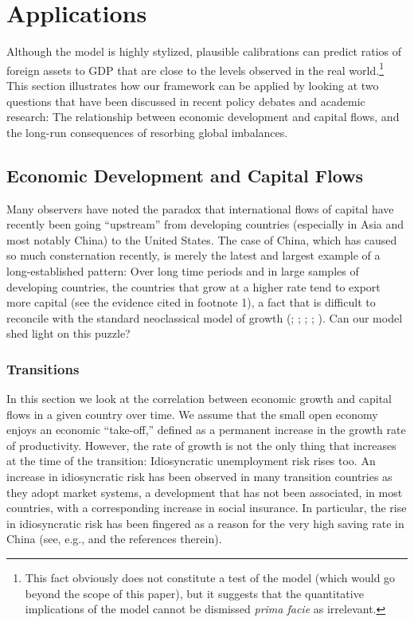 \documentclass[titlepage]{\econtex}\newcommand{\texname}{cjSOE}
\begin{document}
\medskip



\section{Applications}

Although the model is highly stylized, plausible calibrations can
predict ratios of foreign assets to GDP that are close to the levels
observed in the real world.\footnote{This fact obviously does not constitute a
test of the model (which would go beyond the scope of this paper), but
it suggests that the quantitative implications of the model cannot be
dismissed {\it prima facie} as irrelevant.} This section illustrates
how our framework can be applied by looking at two questions that have
been discussed in recent policy debates and academic research: The
relationship between economic development and capital flows, and the
long-run consequences of resorbing global imbalances.

\subsection{Economic Development and Capital Flows}

Many observers have noted the paradox that international flows of
capital have recently been going ``upstream'' from developing
countries (especially in Asia and most notably China) to the United
States. The case of China, which has caused so much consternation
recently, is merely the latest and largest example of a
long-established pattern: Over long time periods and in large samples
of developing countries, the countries that grow at a higher rate tend
to export more capital (see the evidence cited in footnote 1), a fact
that is difficult to reconcile with the standard neoclassical model of
growth (\cite{carroll&weil:crcs}; \cite{cow:habits};
\cite{gourinchasJeannePuzzle}; \cite{prs:brookings};
\cite{sandri:growthcapflows}). Can our model shed light on this
puzzle?

\subsubsection{Transitions}

In this section we look at the correlation between economic growth and
capital flows in a given country over time. We assume that the small
open economy enjoys an economic ``take-off,'' defined as a permanent
increase in the growth rate of productivity. However, the rate of
growth is not the only thing that increases at the time of the
transition: Idiosyncratic unemployment risk rises too. An increase in
idiosyncratic risk has been observed in many transition countries as
they adopt market systems, a development that has not been associated,
in most countries, with a corresponding increase in social
insurance. In particular, the rise in idiosyncratic risk has been
fingered as a reason for the very high saving rate in China (see,
e.g., \cite{cpChina} and the references therein).
\end{document}
